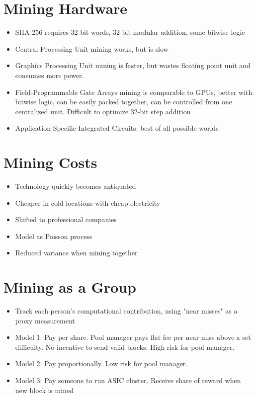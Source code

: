 \documentclass{article}
\begin{document}
\section{Mining Hardware}
\begin{itemize}
\item SHA-256 requires 32-bit words, 32-bit modular addition, some bitwise logic
\item Central Processing Unit mining works, but is slow
\item Graphics Processing Unit mining is faster, but wastes floating point unit and consumes more power.
\item Field-Programmable Gate Arrays mining is comparable to GPUs, better with bitwise logic, can be easily packed together, can be controlled from one centralized unit. Difficult to optimize 32-bit step addition
\item Application-Specific Integrated Circuits: best of all possible worlds
\end{itemize}

\section{Mining Costs}
\begin{itemize}
\item Technology quickly becomes antiquated
\item Cheaper in cold locations with cheap electricity
\item Shifted to professional companies
\item Model as Poisson process
\item Reduced variance when mining together
\end{itemize}

\section{Mining as a Group}
\begin{itemize}
\item Track each person's computational contribution, using "near misses" as a proxy measurement
\item Model 1: Pay per share. Pool manager pays flat fee per near miss above a set difficulty. No incentive to send valid blocks. High risk for pool manager.
\item Model 2: Pay proportionally. Low risk for pool manager.
\item Model 3: Pay someone to run ASIC cluster. Receive share of reward when new block is mined
\end{itemize}
\end{document}
